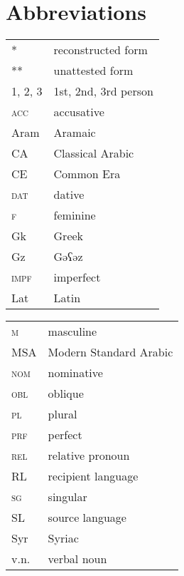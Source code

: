 \documentclass[output=paper]{langsci/langscibook}
\begin{document}
\section*{Abbreviations}
\begin{tabularx}{.45\textwidth}{lQ}
*             &  reconstructed form\\
**            &  unattested form\\
\textsc {1, 2, 3} & 1st, 2nd, 3rd person \\
\textsc{acc}  &  accusative\\
Aram         &  Aramaic\\
CA            &  Classical Arabic\\
CE            &  Common Era\\
\textsc{dat}  &  dative\\
\textsc{f}    &  feminine\\
Gk           &  Greek\\
Gz           &  Gəʕəz\\
\textsc{impf} &  imperfect\\
Lat           &  Latin\\
\end{tabularx}
\begin{tabularx}{.45\textwidth}{lQ}
\textsc{m}    &  masculine\\
MSA           &  Modern Standard Arabic\\
\textsc{nom}  &  nominative\\
\textsc{obl}  &  oblique\\
\textsc{pl}   &  plural\\
\textsc{prf}  &  perfect\\
\textsc{rel}  &  relative pronoun\\
RL          &  recipient language\\
\textsc{sg}   &  singular\\
SL          &  source language\\
Syr          &  Syriac\\
v.n.         &  verbal noun\\
\end{tabularx}


{\sloppy\printbibliography[heading=subbibliography,notkeyword=this]}
\end{document}
